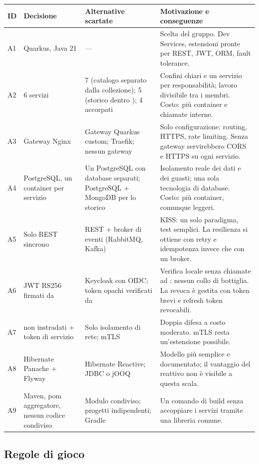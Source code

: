 \documentclass[11pt,a4paper]{article}
\begin{document}
\begin{xltabular}{\linewidth}{@{}L{0.8cm}L{3.3cm}L{4.4cm}Y@{}}
  \toprule
  ID & Decisione & Alternative scartate & Motivazione e conseguenze \\
  \midrule
  \endhead
  A1 & Quarkus, Java 21 & — & Scelta del gruppo. Dev Services, estensioni pronte per REST, JWT, ORM, fault tolerance. \\
  A2 & 6 servizi & 7 (catalogo separato dalla collezione); 5 (storico dentro ); 4 accorpati & Confini chiari e un servizio per responsabilità; lavoro divisibile tra i membri. Costo: più container e chiamate interne. \\
  A3 & Gateway Nginx & Gateway Quarkus custom; Traefik; nessun gateway & Solo configurazione: routing, HTTPS, rate limiting. Senza gateway servirebbero CORS e HTTPS su ogni servizio. \\
  A4 & PostgreSQL, un container per servizio & Un PostgreSQL con database separati; PostgreSQL + MongoDB per lo storico & Isolamento reale dei dati e dei guasti; una sola tecnologia di database. Costo: più container, comunque leggeri. \\
  A5 & Solo REST sincrono & REST + broker di eventi (RabbitMQ, Kafka) & KISS: un solo paradigma, test semplici. La resilienza si ottiene con retry e idempotenza invece che con un broker. \\
  A6 & JWT RS256 firmati da  & Keycloak con OIDC; token opachi verificati da  & Verifica locale senza chiamate ad ; nessun collo di bottiglia. La revoca è gestita con token brevi e refresh token revocabili. \\
  A7 &  non instradati + token di servizio & Solo isolamento di rete; mTLS & Doppia difesa a costo moderato. mTLS resta un'estensione possibile. \\
  A8 & Hibernate Panache + Flyway & Hibernate Reactive; JDBC o jOOQ & Modello più semplice e documentato; il vantaggio del reattivo non è visibile a questa scala. \\
  A9 & Maven, pom aggregatore, nessun codice condiviso & Modulo  condiviso; progetti indipendenti; Gradle & Un comando di build senza accoppiare i servizi tramite una libreria comune. \\
  \bottomrule
\end{xltabular}

\subsection{Regole di gioco}
\end{document}
